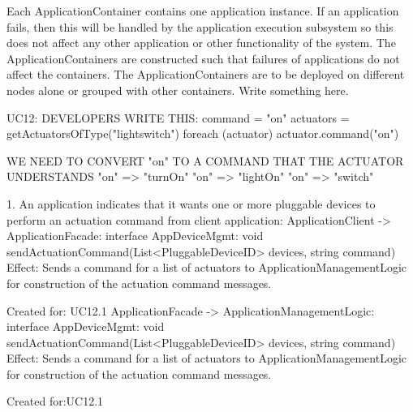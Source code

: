         Each ApplicationContainer contains one application instance. If an application fails,
        then this will be handled by the application execution subsystem so this
        does not affect any other application or other functionality of the system.
        The ApplicationContainers are constructed such that failures of applications
        do not affect the containers. The ApplicationContainers are to be deployed
        on different nodes alone or grouped with other containers. Write something here.




        UC12:
            DEVELOPERS WRITE THIS: command = "on"
            actuators = getActuatorsOfType("lightswitch")
            foreach (actuator) {
                actuator.command("on")
            }

            WE NEED TO CONVERT "on" TO A COMMAND THAT THE ACTUATOR UNDERSTANDS
            "on" => "turnOn"
            "on" => "lightOn"
            "on" => "switch"

            1. An application indicates that it wants one or more pluggable devices to perform an actuation command
                from client application:
                    ApplicationClient -> ApplicationFacade:           interface AppDeviceMgmt:       void sendActuationCommand(List<PluggableDeviceID> devices, string command)
                        Effect: Sends a command for a list of actuators to ApplicationManagementLogic for construction of the actuation command messages.
                        \item Created for: UC12.1
                    ApplicationFacade -> ApplicationManagementLogic:  interface AppDeviceMgmt:  void sendActuationCommand(List<PluggableDeviceID> devices, string command)
                        Effect: Sends a command for a list of actuators to ApplicationManagementLogic for construction of the actuation command messages.
                        \item Created for:UC12.1

